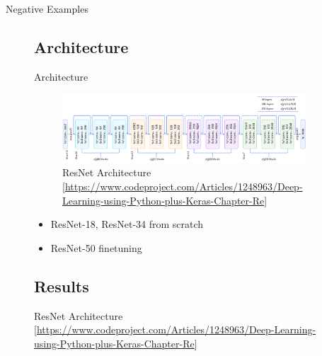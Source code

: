\documentclass[10pt]{beamer}
\begin{document}
\begin{frame}{Negative Examples}
\begin{figure}
\subsection{Architecture}

\begin{frame}{Architecture}
	\begin{figure}
		\includegraphics[width=\columnwidth]{images/resnet.png}
		\caption{ResNet Architecture\newline{} [\url{https://www.codeproject.com/Articles/1248963/Deep-Learning-using-Python-plus-Keras-Chapter-Re}]}
	\end{figure}

	\begin{itemize}
		\item ResNet-18, ResNet-34 from scratch
		\item ResNet-50 finetuning
	\end{itemize}
\end{frame}

\subsection{Results}


\end{figure}
\end{frame}
\end{document}
